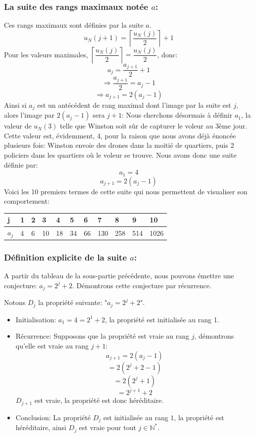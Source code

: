 \subsubsection{La suite des rangs maximaux notée $a$:}
Ces rangs maximaux sont définies par la suite $a$.  $$u_N(j+1)=\left\lceil\dfrac{u_N(j)}{2}\right\rceil+1$$
Pour les valeurs maximales, $\left\lceil\dfrac{u_N(j)}{2}\right\rceil=\dfrac{u_N(j)}{2}$, donc:
$$a_j=\dfrac{a_{j+1}}{2}+1$$
$$\Rightarrow \dfrac{a_{j+1}}{2}=a_j-1$$
$$\Rightarrow a_{j+1}=2(a_j-1)$$
Ainsi si $a_j$ est un antécédent de rang maximal dont l'image par la suite est $j$, alors l'image par $2(a_j-1)$ sera $j+1$:
Nous cherchons désormais à définir $a_1$, la valeur de $u_N(3)$ telle que Winston soit sûr de capturer le voleur au 3ème jour. Cette valeur est, évidemment, 4, pour la raison que nous avons déjà énoncée plusieurs fois: Winston envoie des drones dans la moitié de quartiers, puis 2 policiers dans les quartiers où le voleur se trouve.
Nous avons donc une suite définie par:
$$a_1=4$$
$$a_{j+1}=2(a_j-1)$$
Voici les 10 premiers termes de cette suite qui nous permettent de visualiser son comportement:
\begin{table}[h]
\begin{tabular}{|l|l|l|l|l|l|l|l|l|l|l|}
\hline
j    & 1 & 2 & 3  & 4  & 5  & 6  & 7   & 8   & 9   & 10    \\ \hline
$a_j$ & 4 & 6 & 10 & 18 & 34 & 66 & 130 & 258 & 514 & 1026 \\ \hline
\end{tabular}
\end{table}

\subsubsection{Définition explicite de la suite $a$:}
A partir du tableau de la sous-partie précédente, nous pouvons émettre une conjecture: $a_j=2^{j}+2$. Démontrons cette conjecture par récurrence.

Notons $D_j$ la propriété suivante: "$a_j=2^{j}+2$".

\hspace{1cm}

\begin{itemize}
    \item{Initialisation:} $a_1=4=2^1+2$, la propriété est initialisée au rang 1.
    \item{Récurrence:} Supposons que la propriété est vraie au rang $j$, démontrons qu'elle est vraie au rang $j+1$:
    $$a_{j+1}=2(a_j-1)$$
    $$=2(2^{j}+2-1)$$
    $$=2(2^{j}+1)$$
    $$=2^{j+1}+2$$
    $D_{j+1}$ est vraie, la propriété est donc héréditaire.
    \item{Conclusion:} La propriété $D_j$ est initialisée au rang $1$, la propriété est héréditaire, ainsi $D_j$ est vraie pour tout $j\in \mathbb{N}^*.$
\end{itemize}

